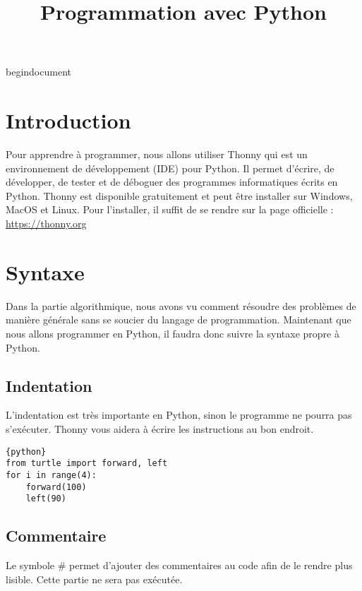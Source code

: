 \documentclass[a4paper,11pt]{article}
\begin{document}
\title{Programmation avec Python}
\date{}
\maketitle

begin{document}
\maketitle

\section{Introduction}
Pour apprendre à programmer, nous allons utiliser Thonny qui est un environnement de développement (IDE) pour Python. Il permet d’écrire, de développer, de tester et de déboguer des programmes informatiques écrits en Python.
Thonny est disponible gratuitement et peut être installer sur Windows, MacOS et Linux.
Pour l’installer, il suffit de se rendre sur la page officielle :  \url{https://thonny.org}

\section{Syntaxe}
Dans la partie algorithmique, nous avons vu comment résoudre des problèmes de manière générale sans se soucier du langage de programmation. Maintenant que nous allons programmer en Python, il faudra donc suivre la syntaxe propre à Python.

\subsection{Indentation}
L'indentation est très importante en Python, sinon le programme ne pourra pas s'exécuter. Thonny vous aidera à écrire les instructions au bon endroit.
\begin{verbatim}{python}
from turtle import forward, left
for i in range(4):
    forward(100)
    left(90)
\end{verbatim}

\subsection{Commentaire}
Le symbole \# permet d'ajouter des commentaires au code afin de le rendre plus lisible. Cette partie ne sera pas exécutée.
\end{document}
